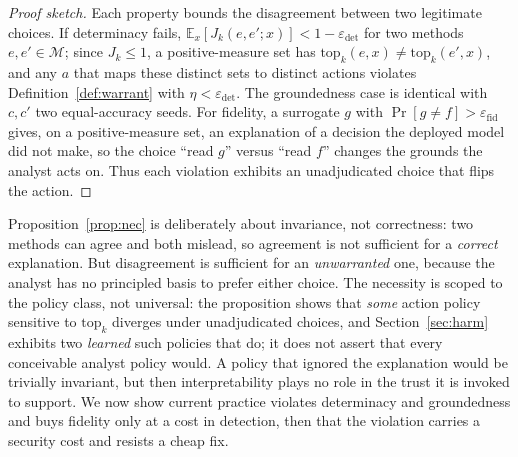 \documentclass[conference]{IEEEtran}
\begin{document}
\begin{proof}[Proof sketch]
Each property bounds the disagreement between two legitimate choices. If determinacy fails,
$\mathbb{E}_x[J_k(e,e';x)]<1-\varepsilon_{\mathrm{det}}$ for two methods $e,e'\in\mathcal{M}$;
since $J_k\le1$, a positive-measure set has $\mathrm{top}_k(e,x)\neq\mathrm{top}_k(e',x)$, and any
$a$ that maps these distinct sets to distinct actions violates Definition~\ref{def:warrant} with
$\eta<\varepsilon_{\mathrm{det}}$. The groundedness case is identical with $c,c'$ two equal-accuracy
seeds. For fidelity, a surrogate $g$ with $\Pr[g\neq f]>\varepsilon_{\mathrm{fid}}$ gives, on a
positive-measure set, an explanation of a decision the deployed model did not make, so the
choice ``read $g$'' versus ``read $f$'' changes the grounds the analyst acts on. Thus each
violation exhibits an unadjudicated choice that flips the action.
\end{proof}

Proposition~\ref{prop:nec} is deliberately about invariance, not correctness: two methods can
agree and both mislead, so agreement is not sufficient for a \emph{correct} explanation. But
disagreement is sufficient for an \emph{unwarranted} one, because the analyst has no principled
basis to prefer either choice. The necessity is scoped to the policy class, not universal: the
proposition shows that \emph{some} action policy sensitive to $\mathrm{top}_k$ diverges under
unadjudicated choices, and Section~\ref{sec:harm} exhibits two \emph{learned} such policies that do;
it does not assert that every conceivable analyst policy would. A policy that ignored the
explanation would be trivially invariant, but then interpretability plays no role in the trust it
is invoked to support. We now show current practice violates determinacy and groundedness and buys
fidelity only at a cost in detection, then that the violation carries a security cost and resists a
cheap fix.
\end{document}

